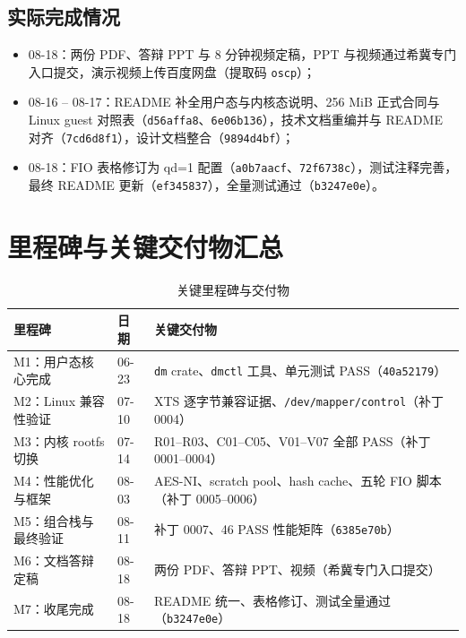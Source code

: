 \subsection{实际完成情况}
\begin{itemize}
    \item 08-18：两份 PDF、答辩 PPT 与 8 分钟视频定稿，PPT 与视频通过希冀专门入口提交，演示视频上传百度网盘（提取码 \texttt{oscp}）；
    \item 08-16 -- 08-17：README 补全用户态与内核态说明、256 MiB 正式合同与 Linux guest 对照表（\texttt{d56affa8}、\texttt{6e06b136}），技术文档重编并与 README 对齐（\texttt{7cd6d8f1}），设计文档整合（\texttt{9894d4bf}）；
    \item 08-18：FIO 表格修订为 qd=1 配置（\texttt{a0b7aacf}、\texttt{72f6738c}），测试注释完善，最终 README 更新（\texttt{ef345837}），全量测试通过（\texttt{b3247e0e}）。
\end{itemize}

\section{里程碑与关键交付物汇总}

\begin{table}[H]
    \centering
    \caption{关键里程碑与交付物}
    \label{tab:milestones}
    \begin{tabular}{p{}p{}p{}}
        \toprule
        \textbf{里程碑} & \textbf{日期} & \textbf{关键交付物} \\
        \midrule
        M1：用户态核心完成 & 06-23 & \texttt{dm} crate、\texttt{dmctl} 工具、单元测试 PASS（\texttt{40a52179}） \\
        M2：Linux 兼容性验证 & 07-10 & XTS 逐字节兼容证据、\texttt{/dev/mapper/control}（补丁 0004） \\
        M3：内核 rootfs 切换 & 07-14 & R01--R03、C01--C05、V01--V07 全部 PASS（补丁 0001--0004） \\
        M4：性能优化与框架 & 08-03 & AES-NI、scratch pool、hash cache、五轮 FIO 脚本（补丁 0005--0006） \\
        M5：组合栈与最终验证 & 08-11 & 补丁 0007、46 PASS 性能矩阵（\texttt{6385e70b}） \\
        M6：文档答辩定稿 & 08-18 & 两份 PDF、答辩 PPT、视频（希冀专门入口提交） \\
        M7：收尾完成 & 08-18 & README 统一、表格修订、测试全量通过（\texttt{b3247e0e}） \\
        \bottomrule
    \end{tabular}
\end{table}

